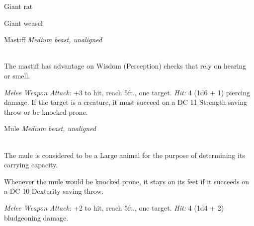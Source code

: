 \documentclass[10pt,twoside,twocolumn,openany]{book}
\begin{document}
Giant rat

Giant weasel

\begin{monsterboxnobg}{Mastiff}
	\textit{Medium beast, unaligned}\\
	\hline
	\basics[
		armorclass	= 12,
		hitpoints 		= 5 (1d8 + 1),
		speed		= {40 ft.}
	]
	\hline
	\stats[
		STR	= \stat{13},
		DEX	= \stat{14},
		CON	= \stat{12},
		INT	= \stat{3},
		WIS	= \stat{12},
		CHA	= \stat{7}
	]
	\hline
	\details[
		skills			= {Perception +3},
		senses		= {passive Perception 13},
		languages		= {-},
		challenge		= 1/8
	]
	\hline \\[1mm]
	\begin{monsteraction}
		The mastiff has advantage on Wisdom (Perception) checks that rely on hearing or smell.
	\end{monsteraction}
	\begin{monsteraction}[Bite]
		\textit{Melee Weapon Attack:} +3 to hit, reach 5ft., one target. \textit{Hit:} 4 (1d6 + 1) piercing damage. If the target is a creature, it must succeed on a DC 11 Strength saving throw or be knocked prone.
	\end{monsteraction}
\end{monsterboxnobg}

\begin{monsterboxnobg}{Mule}
	\textit{Medium beast, unaligned}\\
	\hline
	\basics[
		armorclass	= 10,
		hitpoints 		= 11 (2d8 + 2),
		speed		= {40 ft.}
	]
	\hline
	\stats[
		STR	= \stat{14},
		DEX	= \stat{10},
		CON	= \stat{13},
		INT	= \stat{2},
		WIS	= \stat{10},
		CHA	= \stat{5}
	]
	\hline
	\details[
		skills			= {},
		senses		= {passive Perception 10},
		languages		= {-},
		challenge		= 1/8
	]
	\hline \\[1mm]
	\begin{monsteraction}
		The mule is considered to be a Large animal for the purpose of determining its carrying capacity.
	\end{monsteraction}
	
	\begin{monsteraction}
		Whenever the mule would be knocked prone, it stays on its feet if it succeeds on a DC 10 Dexterity saving throw.
	\end{monsteraction}
	\begin{monsteraction}[Hooves]
		\textit{Melee Weapon Attack:} +2 to hit, reach 5ft., one target. \textit{Hit:} 4 (1d4 + 2) bludgeoning damage.
	\end{monsteraction}
\end{monsterboxnobg}
\end{document}
